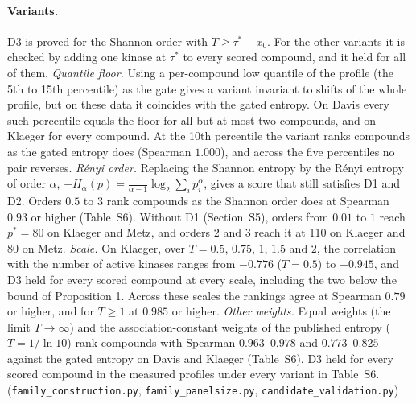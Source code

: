 \documentclass[11pt]{article}
\begin{document}
\paragraph{Variants.} D3 is proved for the Shannon order with
$T \geq \tau^* - x_0$. For the other variants it is checked by adding one kinase
at $\tau^*$ to every scored compound, and it held for all of them.
\emph{Quantile floor.} Using a per-compound low quantile of the profile (the
5th to 15th percentile) as the gate gives a variant invariant to shifts of the
whole profile, but on these data it coincides with the gated entropy. On Davis every such
percentile equals the floor for all but at most two compounds, and on Klaeger
for every compound. At the 10th percentile the variant ranks compounds as the
gated entropy does (Spearman $1.000$), and across the five percentiles no pair
reverses.
\emph{R\'enyi order.} Replacing the Shannon entropy by the R\'enyi entropy of
order $\alpha$, $-H_\alpha(p) = \frac{1}{\alpha - 1}\log_2 \sum_i p_i^\alpha$,
gives a score that still satisfies D1 and D2. Orders $0.5$ to $3$ rank compounds as the Shannon
order does at Spearman $0.93$ or higher (Table~S6). Without D1
(Section~S5), orders from $0.01$ to $1$ reach $p^* = 80$ on Klaeger and Metz,
and orders $2$ and $3$ reach it at 110 on Klaeger and 80 on Metz.
\emph{Scale.} On Klaeger, over $T = 0.5$, $0.75$, $1$, $1.5$ and $2$, the
correlation with the number of active kinases ranges from $-0.776$ ($T = 0.5$)
to $-0.945$, and D3 held for every scored compound at every scale, including
the two below the bound of Proposition 1. Across these scales the rankings
agree at Spearman $0.79$ or higher, and for $T \geq 1$ at $0.985$ or higher.
\emph{Other weights.} Equal weights (the limit $T \to \infty$) and the
association-constant weights of the published entropy ($T = 1/\ln 10$) rank
compounds with Spearman $0.963$--$0.978$ and $0.773$--$0.825$ against the gated
entropy on Davis and Klaeger (Table~S6).
D3 held for every scored compound in the measured profiles under every
variant in Table~S6.
(\texttt{family\_construction.py}, \texttt{family\_panelsize.py},
\texttt{candidate\_validation.py})
\end{document}
